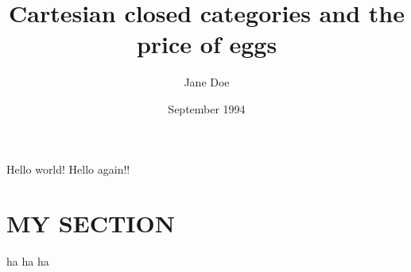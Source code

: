 \documentclass{article}
\title{Cartesian closed categories and the price of eggs}
\author{Jane Doe}
\date{September 1994}
\begin{document}
   \maketitle
   Hello world!
   Hello again!!
   \section{MY SECTION}

   ha ha ha
\end{document}

